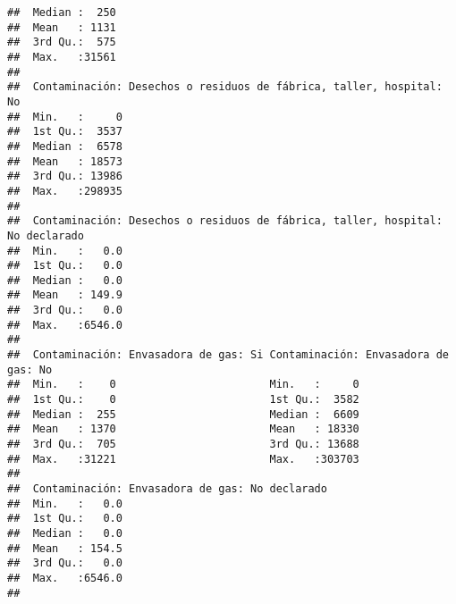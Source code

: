 \documentclass[11pt,]{article}
\begin{document}
\begin{verbatim}
##  Median :  250                                                      
##  Mean   : 1131                                                      
##  3rd Qu.:  575                                                      
##  Max.   :31561                                                      
##                                                                     
##  Contaminación: Desechos o residuos de fábrica, taller, hospital: No
##  Min.   :     0                                                     
##  1st Qu.:  3537                                                     
##  Median :  6578                                                     
##  Mean   : 18573                                                     
##  3rd Qu.: 13986                                                     
##  Max.   :298935                                                     
##                                                                     
##  Contaminación: Desechos o residuos de fábrica, taller, hospital: No declarado
##  Min.   :   0.0                                                               
##  1st Qu.:   0.0                                                               
##  Median :   0.0                                                               
##  Mean   : 149.9                                                               
##  3rd Qu.:   0.0                                                               
##  Max.   :6546.0                                                               
##                                                                               
##  Contaminación: Envasadora de gas: Si Contaminación: Envasadora de gas: No
##  Min.   :    0                        Min.   :     0                      
##  1st Qu.:    0                        1st Qu.:  3582                      
##  Median :  255                        Median :  6609                      
##  Mean   : 1370                        Mean   : 18330                      
##  3rd Qu.:  705                        3rd Qu.: 13688                      
##  Max.   :31221                        Max.   :303703                      
##                                                                           
##  Contaminación: Envasadora de gas: No declarado
##  Min.   :   0.0                                
##  1st Qu.:   0.0                                
##  Median :   0.0                                
##  Mean   : 154.5                                
##  3rd Qu.:   0.0                                
##  Max.   :6546.0                                
##                                                

\end{verbatim}
\end{document}
